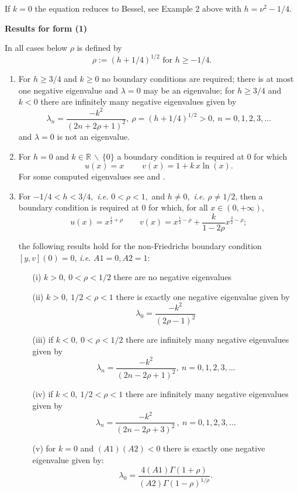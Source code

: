 \documentclass[12pt]{amsart}%
\theoremstyle{plain}
\numberwithin{equation}{section}
\begin{document}
\begin{enumerate}
If $k=0$ the equation reduces to Bessel, see Example 2 above with $h=\nu
^{2}-1/4$.

\noindent\textbf{Results for form (1)}

In all cases below $\rho$ is defined by
\[
\rho:=(h+1/4)^{1/2}\text{ for }h\geq-1/4.
\]

\begin{enumerate}
\item For $h\geq3/4$ and $k\geq0$ no boundary conditions are required; there
is at most one negative eigenvalue and $\lambda=0$ may be an eigenvalue; for
$h\geq3/4$ and $k<0$ there are infinitely many negative eigenvalues given by
\[
\lambda_{n}=\frac{-k^{2}}{(2n+2\rho+1)^{2}},\ \rho=(h+1/4)^{1/2}%
>0,\ n=0,1,2,3,\ldots
\]
and $\lambda=0$ is not an eigenvalue.

\item For $h=0$ and $k\in\mathbb{R}\,\backslash\,\{0\}$ a boundary condition
is required at $0$ for which
\[
u(x)=x\quad\quad\ v(x)=1+k\,x\ln(x).
\]
For some computed eigenvalues see \cite{BEZ} and \cite[Section 10]{J}.

\item For $-1/4<h<3/4,$ \textit{i.e.} $0<\rho<1,$ and $h\neq0,$ \textit{i.e.}
$\rho\not =1/2$, then a boundary condition is required at $0$ for which, for
all $x\in(0,+\infty),$%
\[
u(x)=x^{\frac{1}{2}+\rho}\quad\quad v(x)=x^{\frac{1}{2}-\rho}+\frac{k}%
{1-2\rho}x^{\frac{3}{2}-\rho};
\]

the following results hold for the non-Friedrichs boundary condition
$[y,v](0)=0$, \textit{i.e.} $A1=0,A2=1$:

\begin{itemize}
\item[(i)] $k>0,\ 0<\rho<1/2$ there are no negative eigenvalues

\item[(ii)] $k>0,\ 1/2<\rho<1$ there is exactly one negative eigenvalue given
by
\[
\lambda_{0}=\frac{-k^{2}}{(2\rho-1)^{2}}%
\]

\item[(iii)] if $k<0,\ 0<\rho<1/2$ there are infinitely many negative
eigenvalues given by
\[
\lambda_{n}=\frac{-k^{2}}{(2n-2\rho+1)^{2}},\ n=0,1,2,3,\ldots
\]

\item[(iv)] if $k<0,\ 1/2<\rho<1$ there are infinitely many negative
eigenvalues given by
\[
\lambda_{n}=\frac{-k^{2}}{(2n-2\rho+3)^{2}}\,,\ n=0,1,2,3,\ldots
\]

\item[(v)] for $k=0$ and $(A1)(A2)<0$ there is exactly one negative eigenvalue
given by:
\[
\lambda_{0}=\frac{4\left(  A1\right)  \Gamma(1+\rho)}{\left(  A2\right)
\Gamma(1-\rho)^{1/\rho}}.
\]
\end{itemize}


\end{enumerate}
\end{enumerate}
\end{document}
